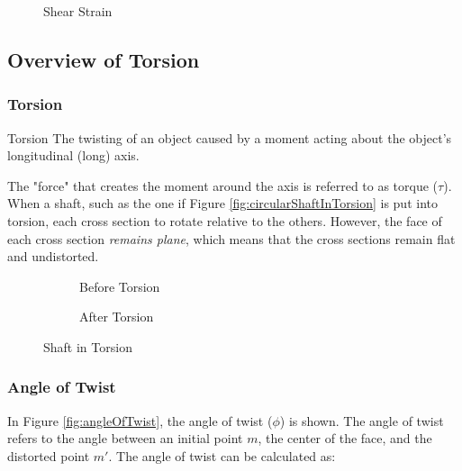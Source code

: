 \documentclass[12pt]{article}
\begin{document}
\begin{figure}[H]
  \centering
  
  \caption{Shear Strain}
  \label{fig:037}
\end{figure}

\subsection{Overview of Torsion}
\label{ssec:overviewOfTorsion}

\subsubsection{Torsion}
\label{sssec:torsion}

\begin{definition}{Torsion}
  The twisting of an object caused by a moment acting about the object's longitudinal (long) axis.
\end{definition}

The "force" that creates the moment around the axis is referred to as torque ($\tau$). When a shaft, such as the one if Figure \ref{fig:circularShaftInTorsion} is put into torsion, each cross section to rotate relative to the others. However, the face of each cross section \textit{remains plane}, which means that the cross sections remain flat and undistorted.

\begin{figure}[H]
  \centering
  \begin{subfigure}[H]{0.45\textwidth}
    \centering
    
    \caption{Before Torsion}
    \label{fig:035}
  \end{subfigure}
  \begin{subfigure}[H]{0.45\textwidth}
    \centering
    
    \caption{After Torsion}
    \label{fig:036}
  \end{subfigure}
  \caption{Shaft in Torsion}
  \label{fig:shaftInTorsion}
  \vspace{-22pt}
\end{figure}

\subsubsection{Angle of Twist}
\label{sssec:angleOfTwist}

In Figure \ref{fig:angleOfTwist}, the angle of twist ($\phi$) is shown. The angle of twist refers to the angle between an initial point $m$, the center of the face, and the distorted point $m'$. The angle of twist can be calculated as:
\end{document}
